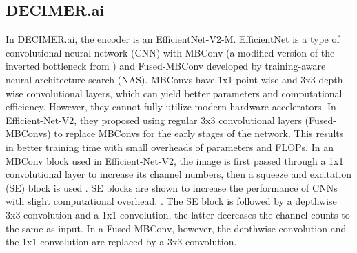 \documentclass{article}
\begin{document}
\subsection{DECIMER.ai}
In DECIMER.ai, the encoder is an EfficientNet-V2-M. EfficientNet is a type of convolutional neural network (CNN) with MBConv \autocite{tan_efficientnet:_2020} (a modified version of the inverted bottleneck from \autocite{mobilenet}) and Fused-MBConv \autocite{suyog_efficientnet-edgetpu:_2019} developed by training-aware neural architecture search (NAS). \autocite{swin_tran} \autocite{effv2} MBConvs have 1x1 point-wise and 3x3 depth-wise convolutional layers, which can yield better parameters and computational efficiency. \autocite{mobilenet} \autocite{effv2} However, they cannot fully utilize modern hardware accelerators. In Efficient-Net-V2, they proposed using regular 3x3 convolutional layers (Fused-MBConvs) to replace MBConvs for the early stages of the network. This results in better training time with small overheads of parameters and FLOPs. In an MBConv block used in Efficient-Net-V2, the image is first passed through a 1x1 convolutional layer to increase its channel numbers, then a squeeze and excitation (SE) block is used \autocite{hu_squeeze-and-excitation_2019}\autocite{tan_efficientnet:_2020}. SE blocks are shown to increase the performance of CNNs with slight computational overhead. \autocite{hu_squeeze-and-excitation_2019}. The SE block is followed by a depthwise 3x3 convolution and a 1x1 convolution, the latter decreases the channel counts to the same as input. In a Fused-MBConv, however, the depthwise convolution and the 1x1 convolution are replaced by a 3x3 convolution. \autocite{effv2} \autocite{mobilenet}
\end{document}
